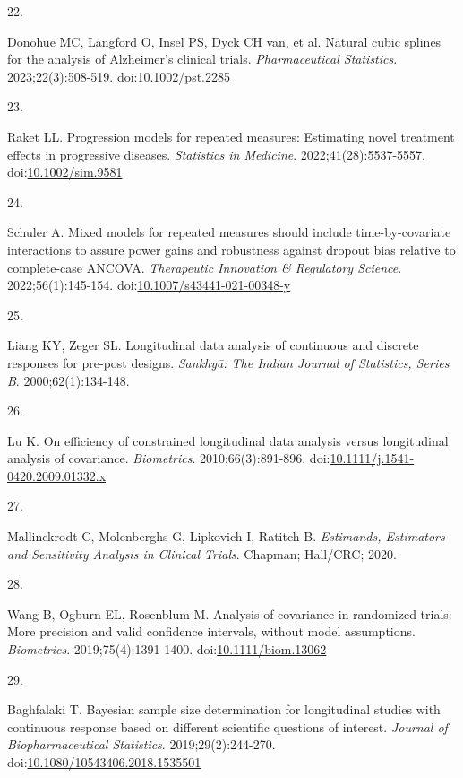 \documentclass[
  11pt,
]{article}
\newlength{\cslhangindent}
\newlength{\csllabelwidth}
\newenvironment{CSLReferences}[2] %
 {\begin{list}{}{%
  \setlength{\itemindent}{0pt}
  \setlength{\leftmargin}{0pt}
  \setlength{\parsep}{0pt}
  \ifodd #1
   \setlength{\leftmargin}{\cslhangindent}
   \setlength{\itemindent}{-1\cslhangindent}
  \fi
  \setlength{\itemsep}{#2\baselineskip}}}
 {\end{list}}
\newcommand{\CSLLeftMargin}[1]{\parbox[t]{\csllabelwidth}{\strut#1\strut}}
\newcommand{\CSLRightInline}[1]{\parbox[t]{\linewidth - \csllabelwidth}{\strut#1\strut}}
\begin{document}
\begin{CSLReferences}{0}{1}
\CSLLeftMargin{22. }%
\CSLRightInline{{Donohue MC, Langford O, Insel PS, Dyck CH van, et al.} Natural cubic splines for the analysis of {Alzheimer's} clinical trials. \emph{Pharmaceutical Statistics}. 2023;22(3):508-519. doi:\href{https://doi.org/10.1002/pst.2285}{10.1002/pst.2285}}

\CSLLeftMargin{23. }%
\CSLRightInline{Raket LL. Progression models for repeated measures: Estimating novel treatment effects in progressive diseases. \emph{Statistics in Medicine}. 2022;41(28):5537-5557. doi:\href{https://doi.org/10.1002/sim.9581}{10.1002/sim.9581}}

\CSLLeftMargin{24. }%
\CSLRightInline{Schuler A. Mixed models for repeated measures should include time-by-covariate interactions to assure power gains and robustness against dropout bias relative to complete-case {ANCOVA}. \emph{Therapeutic Innovation \& Regulatory Science}. 2022;56(1):145-154. doi:\href{https://doi.org/10.1007/s43441-021-00348-y}{10.1007/s43441-021-00348-y}}

\CSLLeftMargin{25. }%
\CSLRightInline{Liang KY, Zeger SL. Longitudinal data analysis of continuous and discrete responses for pre-post designs. \emph{Sankhy{ā}: The Indian Journal of Statistics, Series B}. 2000;62(1):134-148.}

\CSLLeftMargin{26. }%
\CSLRightInline{Lu K. On efficiency of constrained longitudinal data analysis versus longitudinal analysis of covariance. \emph{Biometrics}. 2010;66(3):891-896. doi:\href{https://doi.org/10.1111/j.1541-0420.2009.01332.x}{10.1111/j.1541-0420.2009.01332.x}}

\CSLLeftMargin{27. }%
\CSLRightInline{Mallinckrodt C, Molenberghs G, Lipkovich I, Ratitch B. \emph{Estimands, Estimators and Sensitivity Analysis in Clinical Trials}. Chapman; Hall/CRC; 2020.}

\CSLLeftMargin{28. }%
\CSLRightInline{Wang B, Ogburn EL, Rosenblum M. Analysis of covariance in randomized trials: More precision and valid confidence intervals, without model assumptions. \emph{Biometrics}. 2019;75(4):1391-1400. doi:\href{https://doi.org/10.1111/biom.13062}{10.1111/biom.13062}}

\CSLLeftMargin{29. }%
\CSLRightInline{Baghfalaki T. Bayesian sample size determination for longitudinal studies with continuous response based on different scientific questions of interest. \emph{Journal of Biopharmaceutical Statistics}. 2019;29(2):244-270. doi:\href{https://doi.org/10.1080/10543406.2018.1535501}{10.1080/10543406.2018.1535501}}

\end{CSLReferences}
\end{document}
